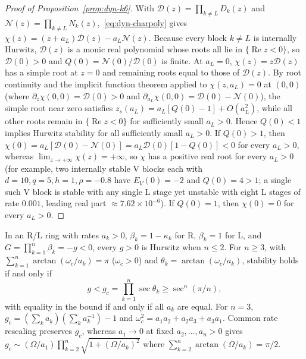 \begin{proof}[Proof of Proposition~{\upshape\ref{prop:dyn-k6}}]
With $\mathcal{D}(z) = \prod_{k \ne L} D_k(z)$ and $\mathcal{N}(z) = \prod_{k \ne L} N_k(z)$,~\eqref{eq:dyn-charpoly} gives $\chi(z) = (z + a_L)\mathcal{D}(z) - a_L\mathcal{N}(z)$. Because every block $k \ne L$ is internally Hurwitz, $\mathcal{D}(z)$ is a monic real polynomial whose roots all lie in $\{\operatorname{Re} z < 0\}$, so $\mathcal{D}(0) > 0$ and $Q(0) = \mathcal{N}(0)/\mathcal{D}(0)$ is finite. At $a_L = 0$, $\chi(z) = z\mathcal{D}(z)$ has a simple root at $z = 0$ and remaining roots equal to those of $\mathcal{D}(z)$. By root continuity and the implicit function theorem applied to $\chi(z, a_L) = 0$ at $(0, 0)$ (where $\partial_z \chi(0, 0) = \mathcal{D}(0) > 0$ and $\partial_{a_L}\chi(0, 0) = \mathcal{D}(0) - \mathcal{N}(0)$), the simple root near zero satisfies $z_s(a_L) = a_L[Q(0) - 1] + O(a_L^2)$, while all other roots remain in $\{\operatorname{Re} z < 0\}$ for sufficiently small $a_L > 0$. Hence $Q(0) < 1$ implies Hurwitz stability for all sufficiently small $a_L > 0$. If $Q(0) > 1$, then $\chi(0) = a_L[\mathcal{D}(0) - \mathcal{N}(0)] = a_L\mathcal{D}(0)[1 - Q(0)] < 0$ for every $a_L > 0$, whereas $\lim_{z \to +\infty}\chi(z) = +\infty$, so $\chi$ has a positive real root for every $a_L > 0$ (for example, two internally stable V blocks each with $d = 10, q = 5, h = 1, \rho = -0.8$ have $E_V(0) = -2$ and $Q(0) = 4 > 1$; a single such V block is stable with any single L stage yet unstable with eight L stages of rate $0.001$, leading real part $\approx 7.62 \times 10^{-6}$). If $Q(0) = 1$, then $\chi(0) = 0$ for every $a_L > 0$.
\end{proof}

\begin{proposition}\label{prop:dyn-k7}
In an R/L ring with rates $a_k > 0$, $\beta_k = 1 - \kappa_k$ for R, $\beta_k = 1$ for L, and $G = \prod_{k=1}^n \beta_k = -g < 0$, every $g > 0$ is Hurwitz when $n \le 2$. For $n \ge 3$, with $\sum_{k=1}^n \arctan(\omega_c/a_k) = \pi$ ($\omega_c > 0$) and $\theta_k = \arctan(\omega_c/a_k)$, stability holds if and only if
\begin{equation}\label{eq:dyn-secant}
g < g_c = \prod_{k=1}^n \sec\theta_k \ge \sec^n(\pi/n),
\end{equation}
with equality in the bound if and only if all $a_k$ are equal. For $n = 3$, $g_c = (\sum_k a_k)(\sum_k a_k^{-1}) - 1$ and $\omega_c^2 = a_1 a_2 + a_2 a_3 + a_3 a_1$. Common rate rescaling preserves $g_c$, whereas $a_1 \to 0$ at fixed $a_2, \dots, a_n > 0$ gives $g_c \sim (\Omega/a_1)\prod_{k=2}^n \sqrt{1 + (\Omega/a_k)^2}$ where $\sum_{k=2}^n \arctan(\Omega/a_k) = \pi/2$.
\end{proposition}

